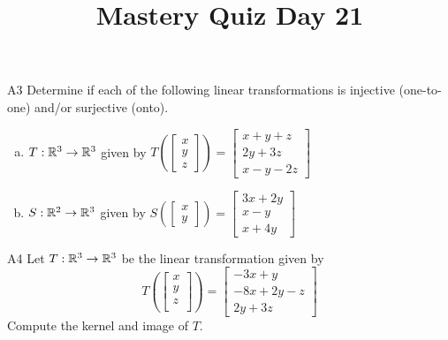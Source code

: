 \documentclass{sbgLAquiz}
\title{Mastery Quiz Day 21 }
\begin{document}
\begin{problem}{A3}
Determine if each of the following linear transformations is injective (one-to-one) and/or surjective (onto).
\begin{enumerate}[(a)]
\item $T: \mathbb{R}^3 \rightarrow \mathbb{R}^3$ given by $T\left(\begin{bmatrix} x \\ y \\ z  \end{bmatrix} \right) = \begin{bmatrix} x+y+z \\ 2y+3z \\ x-y-2z \end{bmatrix} $
\item $S: \mathbb{R}^2 \rightarrow \mathbb{R}^3$ given by $S\left(\begin{bmatrix} x \\ y  \end{bmatrix} \right) = \begin{bmatrix} 3x+2y \\ x-y \\ x+4y \end{bmatrix} $
\end{enumerate}
\end{problem}

\begin{problem}{A4}
Let $T: \mathbb{R}^3\rightarrow \mathbb{R}^3$ be the linear transformation given by $$T\left(\begin{bmatrix} x \\ y \\ z \\  \end{bmatrix} \right) = \begin{bmatrix} -3x+y \\ -8x+2y-z \\ 2y+3z \end{bmatrix}$$
Compute the kernel and image of $T$.
\end{problem}
\end{document}

